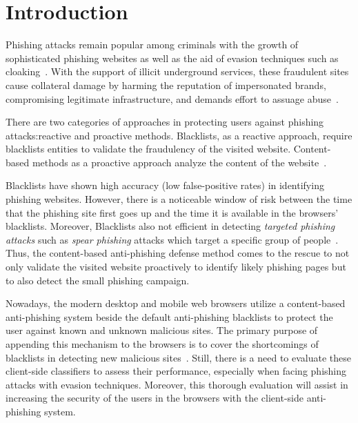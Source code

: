 

\section{Introduction}
\label{s:intro}

Phishing attacks remain popular among criminals with the growth of sophisticated phishing websites as well as the aid of evasion techniques such as cloaking~\cite{oest2020phishtime,hao2013understanding,internet-crime-complaint-center-(ic3)-business-e-mail-compromise-the-12-billion-dollar-scam}. With the support of illicit underground services, these fraudulent sites cause collateral damage by harming the reputation of impersonated brands, compromising legitimate infrastructure, and demands effort to assuage abuse~\cite{zhang2007cantina}.

There are two categories of approaches in protecting users against phishing attacks:reactive and proactive methods. Blacklists, as a reactive approach, require blacklists entities to validate the fraudulency of the visited website. Content-based methods as a proactive approach analyze the content of the website~\cite{wang2011verilogo}.

Blacklists have shown high accuracy (low false-positive rates) in identifying phishing websites. However, there is a noticeable window of risk between the time that the phishing site first goes up and the time it is available in the browsers' blacklists. Moreover, Blacklists also not efficient in detecting \textit{targeted phishing attacks} such as \textit{spear phishing} attacks which target a specific group of people~\cite{burns2019spear}.
Thus, the content-based anti-phishing defense method comes to the rescue to not only validate the visited website proactively to identify likely phishing pages but to also detect the small phishing campaign.

Nowadays, the modern desktop and mobile web browsers utilize a content-based anti-phishing system beside the default anti-phishing blacklists to protect the user against known and unknown malicious sites. The primary purpose of appending this mechanism to the browsers is to cover the shortcomings of blacklists in detecting new malicious sites~\cite{googlechromeprivacywhitepaper}. Still, there is a need to evaluate these client-side classifiers to assess their performance, especially when facing phishing attacks with evasion techniques. Moreover, this thorough evaluation will assist in increasing the security of the users in the browsers with the client-side anti-phishing system.

